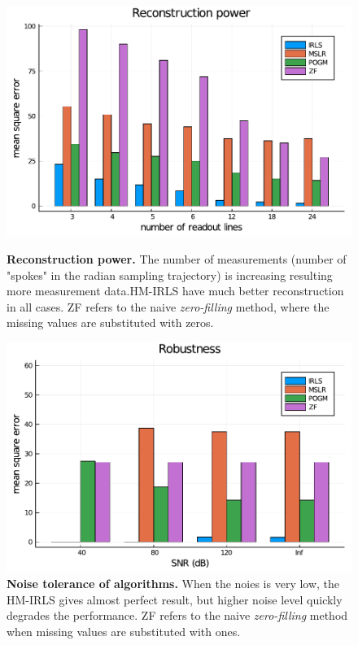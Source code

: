 \begin{figure}
    \centering
    \begin{minipage}[t]{0.48\linewidth}
        \centering
        \includegraphics[width=\linewidth]{images/reconstruction_power.pdf}
        \caption{\textbf{Reconstruction power.} The number of measurements (number of "spokes" in the radian sampling trajectory) is increasing resulting more measurement data.HM-IRLS have much better reconstruction in all cases. ZF refers to the naive \textit{zero-filling} method, where the missing values are substituted with zeros.}
        \label{fig:reconstruction_power}
    \end{minipage}
    \begin{minipage}[t]{0.48\linewidth}
        \centering
        \includegraphics[width=\linewidth]{images/noise_tolerance.pdf}
        \caption{\textbf{Noise tolerance of algorithms.} When the noies is very low, the HM-IRLS gives almost perfect result, but higher noise level quickly degrades the performance. ZF refers to the naive \textit{zero-filling} method when missing values are substituted with ones.}
        \label{fig:noise_tolerance}
    \end{minipage}
\end{figure}

